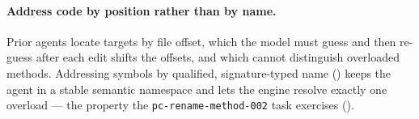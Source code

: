 \paragraph{Address code by position rather than by name.} Prior agents locate targets
by file offset, which the model must guess and then re-guess after each edit shifts the
offsets, and which cannot distinguish overloaded methods. Addressing symbols by
qualified, signature-typed name () keeps the agent in a stable
semantic namespace and lets the engine resolve exactly one overload --- the property
the \texttt{pc-rename-method-002} task exercises ().
